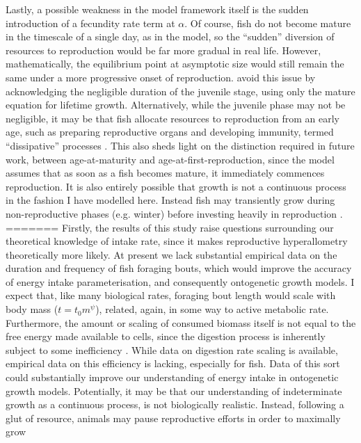\documentclass[a4paper]{article} %
\begin{document}
\begin{center}
\begin{minipage}{\linewidth}
Lastly, a possible weakness in the model framework itself is the sudden introduction of a fecundity rate term at $\alpha$. Of course, fish do not become mature in the timescale of a single day, as in the model, so the ``sudden'' diversion of resources to reproduction would be far more gradual in real life. However, mathematically, the equilibrium point at asymptotic size would still remain the same under a more progressive onset of reproduction. \textcite{West2001} avoid this issue by acknowledging the negligible duration of the juvenile stage, using only the mature equation for lifetime growth. Alternatively, while the juvenile phase may not be negligible, it may be that fish allocate resources to reproduction from an early age, such as preparing reproductive organs and developing immunity, termed ``dissipative'' processes \autocite{kooijman2010dynamic, Kearney2012a, Marshall2019b}. This also sheds light on the distinction required in future work, between age-at-maturity and age-at-first-reproduction, since the model assumes that as soon as a fish becomes mature, it immediately commences reproduction. It is also entirely possible that growth is not a continuous process in the fashion I have modelled here. Instead fish may transiently grow during non-reproductive phases (e.g. winter) before investing heavily in reproduction \autocite{Kozowski1987-indeterminate}.
=======
Firstly, the results of this study raise questions surrounding our theoretical knowledge of intake rate, since it makes reproductive hyperallometry theoretically more likely. At present we lack substantial empirical data on the duration and frequency of fish foraging bouts, which would improve the accuracy of energy intake parameterisation, and consequently ontogenetic growth models.  I expect that, like many biological rates, foraging bout length would scale with body mass ($t = t_{0}m^{\psi}$), related, again, in some way to active metabolic rate. Furthermore, the amount or scaling of consumed biomass itself is not equal to the free energy made available to cells, since the digestion process is inherently subject to some inefficiency \autocite{VanGemert2019}. While data on digestion rate scaling is available, empirical data on this efficiency is lacking, especially for fish. Data of this sort could substantially improve our understanding of energy intake in ontogenetic growth models. Potentially, it may be that our understanding of indeterminate growth as a continuous process, is not biologically realistic. Instead, following a glut of resource, animals may pause reproductive efforts in order to maximally grow \autocite{Kozowski1987-indeterminate}


\end{minipage}
\end{center}
\end{document}
